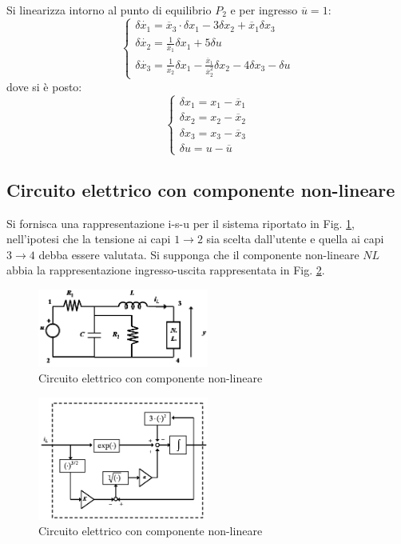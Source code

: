 \documentclass[a4paper]{report}
\begin{document}
Si linearizza intorno al punto di equilibrio $P_2$ e per ingresso
$\overline{u} = 1$:
{\Large
\[
  \left\{
  \begin{array}{l}
    \delta \dot{x_1} = \overline{x}_3 \cdot \delta x_1 - 3 \delta x_2
    + \overline{x}_1 \delta x_3\\
    \delta \dot{x_2} = \frac{1}{\overline{x}_1}\delta x_1 + 5 \delta
    u\\
    \delta \dot{x_3} = \frac{1}{\overline{x}_2} \delta x_1 -
    \frac{\overline{x}_1}{\overline{x}_2^2} \delta x_2 - 4 \delta x_3
    - \delta u
  \end{array}
  \right .
\]
}
dove si \`e posto:
\[
  \left\{
  \begin{array}{l}
    \delta x_1 = x_1 - \overline{x}_1\\
    \delta x_2 = x_2 - \overline{x}_2\\
    \delta x_3 = x_3 - \overline{x}_3\\
    \delta u = u - \overline{u}
  \end{array}
  \right .
\]

\subsection{Circuito elettrico con componente non-lineare}
Si fornisca una rappresentazione i-s-u per il sistema riportato in
Fig. \ref{fig:esempio03}, nell'ipotesi che la tensione ai capi
$1 \rightarrow 2$ sia scelta dall'utente e quella ai capi $3
\rightarrow 4$ debba essere
valutata. Si supponga che il componente non-lineare $NL$ abbia la
rappresentazione ingresso-uscita rappresentata in Fig. \ref{fig:esempio03-2}.
\begin{figure}[!b]
  \centering
  \includegraphics[width=0.5\textwidth]{./images/esempio03.png}
  \caption{Circuito elettrico con componente non-lineare\label{fig:esempio03}}
\end{figure}
\begin{figure}[!t]
  \centering
  \includegraphics[width=0.5\textwidth]{./images/esempio03-2.png}
  \caption{Circuito elettrico con componente non-lineare\label{fig:esempio03-2}}
\end{figure}
\end{document}
